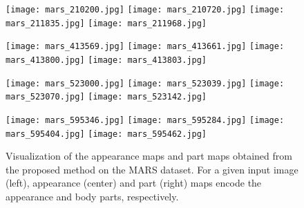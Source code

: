 \documentclass{llncs}
\begin{document}
\setcounter{figure}{6}
\begin{figure}[t]
\centering
	\begin{minipage}{0.99\linewidth}
	\begin{minipage}{0.24\linewidth}
\centering
      \texttt{[image: mars\_210200.jpg]}
      \texttt{[image: mars\_210720.jpg]}
      \texttt{[image: mars\_211835.jpg]}
      \texttt{[image: mars\_211968.jpg]}
    \end{minipage}
	\begin{minipage}{0.24\linewidth}
\centering
      \texttt{[image: mars\_413569.jpg]}
      \texttt{[image: mars\_413661.jpg]}
      \texttt{[image: mars\_413800.jpg]}
      \texttt{[image: mars\_413803.jpg]}
    \end{minipage}
	\begin{minipage}{0.24\linewidth}
\centering
      \texttt{[image: mars\_523000.jpg]}
      \texttt{[image: mars\_523039.jpg]}
      \texttt{[image: mars\_523070.jpg]}
      \texttt{[image: mars\_523142.jpg]}
    \end{minipage}
	\begin{minipage}{0.24\linewidth}
\centering
      \texttt{[image: mars\_595346.jpg]}
      \texttt{[image: mars\_595284.jpg]}
      \texttt{[image: mars\_595404.jpg]}
      \texttt{[image: mars\_595462.jpg]}
    \end{minipage}

    \end{minipage}
\vspace{-.2cm}
\caption{Visualization of the appearance maps  and part maps  obtained from the proposed method on the MARS dataset. For a given input image (left), appearance (center) and part (right) maps encode the appearance and body parts, respectively.}
\label{fig:vis_mars}
\end{figure}
\end{document}
